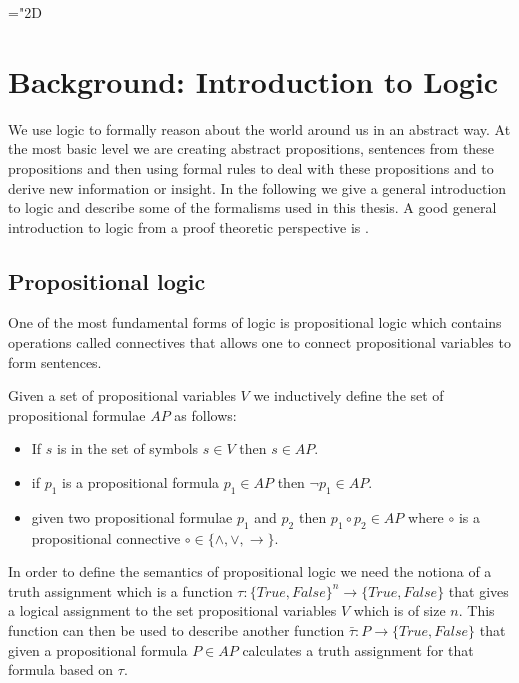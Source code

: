 \mathchardef\mhyphen="2D

\chapter{Background: Introduction to Logic}
We use logic to formally reason about the world around us in an abstract way. At the most basic level we are creating abstract propositions, sentences from these propositions and then using formal rules to deal with these propositions and to derive new information or insight. In the following we give a general introduction to logic and describe some of the formalisms used in this thesis.
A good general introduction to logic from a proof theoretic perspective is \cite{HandBookProof}.


\section{Propositional logic}
One of the most fundamental forms of logic is propositional logic which contains operations called connectives that allows one to connect propositional variables to form sentences.


\begin{mydef}
Given a set of propositional variables $V$ we inductively define the set of propositional formulae $AP$ as follows:
\begin{itemize}
\item If $s$ is in the set of symbols $s \in V$ then $s \in AP$.

\item if $p_1$ is a propositional formula $p_1 \in AP$ then $\neg p_1 \in AP$.

\item given two propositional formulae $p_1$ and $p_2$ then $p_1 \circ p_2 \in AP$ where $\circ$ is a propositional connective $\circ \in \{ \wedge,\vee,\to \} $.
\end{itemize} 
\end{mydef}
In order to define the semantics of propositional logic we need the notiona of a truth assignment which is a function $\tau : \{True,False\}^n \to \{True, False\}$ that gives a logical assignment to the set propositional variables $V$ which is of size $n$. This function can then be used to describe another function $\bar{\tau} : P \to \{True, False\}$ that given a propositional formula $P \in AP$ calculates a truth assignment for that formula based on $\tau$.

